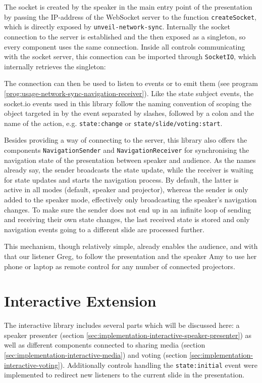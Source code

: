 The socket is created by the speaker in the main entry point of the presentation by passing the IP-address of the WebSocket server to the function \texttt{createSocket}, which is directly exposed by \texttt{unveil-network-sync}. Internally the socket connection to the server is established and the then exposed as a singleton, so every component uses the same connection. Inside all controls communicating with the socket server, this connection can be imported through \texttt{SocketIO}, which internally retrieves the singleton:

The connection can then be used to listen to events or to emit them (see program \ref{prog:usage-network-sync-navigation-receiver}). Like the state subject events, the socket.io events used in this library follow the naming convention of scoping the object targeted in by the event separated by slashes, followed by a colon and the name of the action, e.g. \texttt{state:change} or \texttt{state/slide/voting:start}.


Besides providing a way of connecting to the server, this library also offers the components \texttt{NavigationSender} and \texttt{NavigationReceiver} for synchronising the navigation state of the presentation between speaker and audience. As the names already say, the sender broadcasts the state update, while the receiver is waiting for state updates and starts the navigation process. By default, the latter is active in all modes (default, speaker and projector), whereas the sender is only added to the speaker mode, effectively only broadcasting the speaker's navigation changes. To make sure the sender does not end up in an infinite loop of sending and receiving their own state changes, the last received state is stored and only navigation events going to a different slide are processed further.

This mechanism, though relatively simple, already enables the audience, and with that our listener Greg, to follow the presentation and the speaker Amy to use her phone or laptop as remote control for any number of connected projectors.

\section{Interactive Extension}
\label{sec:implementation-interactive}
The interactive library includes several parts which will be discussed here: a speaker presenter (section \ref{sec:implementation-interactive-speaker-presenter}) as well as different components connected to sharing media (section \ref{sec:implementation-interactive-media}) and voting (section \ref{sec:implementation-interactive-voting}). Additionally controls handling the \texttt{state:initial} event were implemented to redirect new listeners to the current slide in the presentation.

